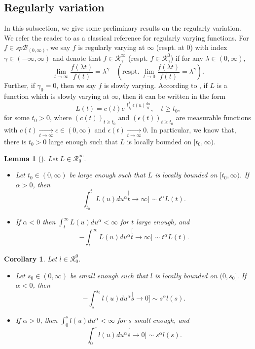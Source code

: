 \documentclass[12pt, a4paper]{amsart}
\newtheorem{lem}[thm]{Lemma}
\newtheorem{cro}[thm]{Corollary}
\theoremstyle{definition}
\numberwithin{equation}{section}
\begin{document}
\subsection{Regularly variation}
\label{sec: Regularly variation}
	In this subsection, we give some preliminary results on the regularly variation.
	We refer the reader to \cite{BinghamGoldieTeugels1989Regular} as a classical reference for regularly varying functions.
	For $f\in sp\mathscr B_{(0,\infty)}$, we say $f$ is regularly varying at $\infty$ (respt. at $0$) with index $\gamma \in (-\infty,\infty)$ and denote that $f\in \mathcal R^\infty_\gamma$ (respt. $f\in \mathcal R^0_\gamma$) if for any $\lambda \in (0,\infty)$, 
\[
	\lim_{t\to\infty}\frac{f(\lambda t)}{f(t)} 
	= \lambda^\gamma
	\quad (\text{respt. } \lim_{t\to 0}\frac{f(\lambda t)}{f(t)}
	= \lambda^\gamma).
\]
	Further, if $\gamma_0 = 0$, then we say $f$ is slowly varying.
	According to \cite[Theorem 1.3.1.]{BinghamGoldieTeugels1989Regular}, if $L$ is a function which is slowly varying at $\infty$, then it can be written in the form
\[
	L(t) 
	= c(t) e^{\int_{t_0}^t \epsilon(u) \frac{du}{u}},\quad t\geq t_0,
\]
	for some $t_0>0$, where $(c(t))_{t\geq t_0}$ and $(\epsilon(t))_{t\geq t_0}$ are measurable functions with $c(t) \xrightarrow[t\to \infty]{} c \in (0,\infty)$ and $\epsilon(t) \xrightarrow[t\to \infty]{} 0$. 
	In particular, we know that, there is $t_0 > 0$ large enough such that $L$ is locally bounded on $[t_0,\infty)$.

\begin{lem}[{\cite[Proposition 1.5.8. and 1.5.10]{BinghamGoldieTeugels1989Regular}}]
\label{lem: exchange slowly varying function and integration}
	Let $L\in \mathcal R^\infty_0$. 
\begin{itemize}
\item 
	Let $t_0\in (0,\infty)$ be large enough such that $L$ is locally bounded on $[t_0,\infty)$. If $\alpha>0 $, then
\[
	\int_{t_0}^t L(u)du^\alpha 
	\stackrel[t\to \infty]{}{\sim} t^\alpha L(t).
\]  
\item 
	If $\alpha< 0$ then $\int_t^\infty L(u) du^\alpha < \infty$ for $t$ large enough, and
\[
	-\int_t^\infty L(u)du^\alpha 
	\stackrel[t\to \infty]{}{\sim} t^\alpha L(t).
\]
\end{itemize}
\end{lem}

\begin{cro}
\label{cro: power law and ingetration}
	Let $l\in \mathcal R^0_0$. 
\begin{itemize}
\item 
	Let $s_0\in (0,\infty)$ be small enough such that $l$ is locally bounded on $(0,s_0]$. 
	If $\alpha < 0$, then 
	\[
	-\int_s^{s_0} l(u)du^\alpha 
	\stackrel[s\to 0]{}{\sim} s^{\alpha} l(s).
	\]
\item
	If $\alpha > 0$, then $\int_0^s l(u)du^\alpha<\infty$ for $s$ small enough, and
\[
	\int_0^s l(u)du^\alpha 
	\stackrel[s\to 0]{}{\sim} s^{\alpha} l(s).
\]  
\end{itemize}
\end{cro}	
\end{document}
